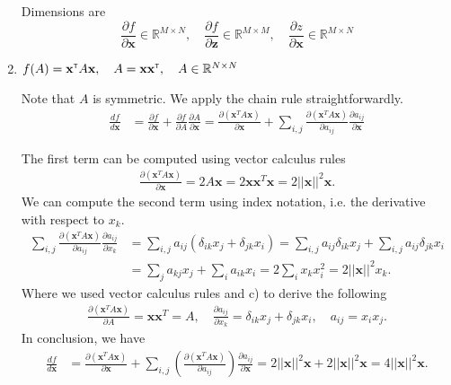 \begin{enumerate}[label=\alph*.]
Dimensions are 
\[
\frac{\partial f}{\partial \textbf{x}} \in \mathbb{R}^{M\times N}, \quad \frac{\partial f}{\partial \textbf{z}}\in\mathbb{R}^{M\times M}, \quad \frac{\partial z}{\partial \textbf{x}}\in\mathbb{R}^{M\times N}
\]

\item $f(A) = \textbf{x}^\mathrm{\textsf{\tiny T}} A \textbf{x}, \quad A=\textbf{x}\textbf{x}^\mathrm{\textsf{\tiny T}}, \quad A\in\mathbb{R}^{N\times N}$

Note that $A$ is symmetric. We apply the chain rule straightforwardly.
\begin{align*}
\frac{d f}{d \textbf{x}} &= \frac{\partial f}{\partial \textbf{x}} + \frac{\partial f}{\partial A} \frac{\partial A}{\partial \textbf{x}} = \frac{\partial (\textbf{x}^T A \textbf{x}) }{\partial \textbf{x}} + \sum_{i,j}\frac{\partial (\textbf{x}^T A \textbf{x}) }{\partial a_{ij}} \frac{\partial a_{ij}}{\partial\textbf{x}}
\end{align*}

The first term can be computed using vector calculus rules
\begin{align*}
\frac{\partial (\textbf{x}^T A \textbf{x}) }{\partial \textbf{x}}  = 2A\textbf{x} = 2\textbf{x}\textbf{x}^T\textbf{x} = 2 ||\textbf{x}||^2\textbf{x}.
\end{align*}
We can compute the second term using index notation, i.e. the derivative with respect to $x_k$.
\begin{align*}
\sum_{i,j}\frac{\partial (\textbf{x}^T A \textbf{x}) }{\partial a_{ij}} \frac{\partial a_{ij}}{\partial x_k} &= \sum_{i,j} a_{ij}\left(\delta_{ik}x_j + \delta_{jk}x_i\right) = \sum_{i,j} a_{ij}\delta_{ik}x_j + \sum_{i,j} a_{ij}\delta_{jk}x_i\\
&= \sum_{j} a_{kj}x_j + \sum_{i} a_{ik}x_i = 2 \sum_{i} x_k x_i^2 = 2 ||\textbf{x}||^2x_k.
\end{align*}
Where we used vector calculus rules and  c) to derive the following
\begin{align*}
\frac{\partial (\textbf{x}^T A \textbf{x}) }{\partial A}  = \textbf{x}\textbf{x}^T = A, \quad \frac{\partial a_{ij}}{\partial x_k} = \delta_{ik}x_j + \delta_{jk}x_i, \quad a_{ij} = x_ix_j.
\end{align*}
In conclusion, we have
\begin{align*}
\frac{d f}{d \textbf{x}} &= \frac{\partial (\textbf{x}^T A \textbf{x}) }{\partial \textbf{x}} + \sum_{i,j}\left(\frac{\partial (\textbf{x}^T A \textbf{x}) }{\partial a_{ij}}\right) \frac{\partial a_{ij}}{\partial\textbf{x}} = 2 ||\textbf{x}||^2\textbf{x}+ 2 ||\textbf{x}||^2\textbf{x} = 4 ||\textbf{x}||^2\textbf{x}.
\end{align*}


\end{enumerate}
